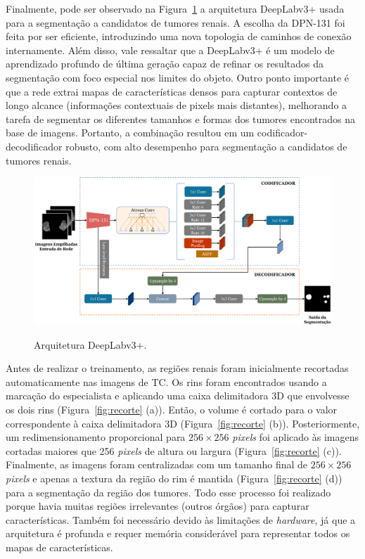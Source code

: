 Finalmente, pode ser observado na Figura~\ref{fig:arquitetura_DeepLabv3+DPN} a arquitetura DeepLabv3+ usada para a segmentação a candidatos de tumores renais. A escolha da DPN-131 foi feita por ser eficiente, introduzindo uma nova topologia de caminhos de conexão internamente. Além disso, vale ressaltar que a DeepLabv3+ é um modelo de aprendizado profundo de última geração capaz de refinar os resultados da segmentação com foco especial nos limites do objeto. Outro ponto importante é que a rede extrai mapas de características densos para capturar contextos de longo alcance (informações contextuais de pixels mais distantes), melhorando a tarefa de segmentar os diferentes tamanhos e formas dos tumores encontrados na base de imagens. Portanto, a combinação resultou em um codificador-decodificador robusto, com alto desempenho para segmentação a candidatos de tumores renais.

\begin{figure}[!ht]
    \centering
    \caption{Arquitetura DeepLabv3+.}
    \includegraphics[width=1\textwidth]{figuras/arquitetura_Deeplabv3+DPN.pdf}
    \label{fig:arquitetura_DeepLabv3+DPN}
\end{figure}

\label{sec:treinamento-DeepLabv3+}

Antes de realizar o treinamento, as regiões renais foram inicialmente recortadas automaticamente nas imagens de TC. Os rins foram encontrados usando a marcação do especialista e aplicando uma caixa delimitadora 3D que envolvesse os dois rins (Figura~\ref{fig:recorte} (a)). Então, o volume é cortado para o valor correspondente à caixa delimitadora 3D (Figura~\ref{fig:recorte} (b)). Posteriormente, um redimensionamento proporcional para $256\times256$ \textit{pixels} foi aplicado às imagens cortadas maiores que 256 \textit{pixels} de altura ou largura (Figura~\ref{fig:recorte} (c)). Finalmente, as imagens foram centralizadas com um tamanho final de $256\times256$ \textit{pixels} e apenas a textura da região do rim é mantida (Figura~\ref{fig:recorte} (d)) para a segmentação da região dos tumores. Todo esse processo foi realizado porque havia muitas regiões irrelevantes (outros órgãos) para capturar características. Também foi necessário devido às limitações de \textit{hardware}, já que a arquitetura é profunda e requer memória considerável para representar todos os mapas de características.


